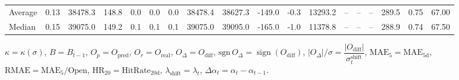 \begin{threeparttable}
{\begin{tabular}{lrrrrrrrrrrrrrrrrr}
Average &     0.13 & 38478.3 &             148.8 &               0.0 &                0.0 &                0.0 & 38478.4 & 38627.3 &     -149.0 &                     -0.3 &             13293.2 &         -- &        -- &             -- &            289.5 &            0.75 &                  67.00 \\
 Median &     0.15 & 39075.0 &             149.2 &               0.1 &                0.1 &                0.1 & 39075.0 & 39095.0 &     -165.0 &                     -1.0 &             11378.8 &         -- &        -- &             -- &            288.9 &            0.74 &                  67.50 \\
\bottomrule
\end{tabular}
}
\begin{tablenotes}\footnotesize
\item $\kappa=\kappa(\sigma)$, $B=B_{t-1}$, $O_p=O_{\text{pred}}$, $O_r=O_{\text{real}}$, $O_\Delta=O_{\text{diff}}$, $\mathrm{sgn}\,O_\Delta=\operatorname{sign}(O_{\text{diff}})$, $|O_\Delta|/\sigma=\dfrac{|O_{\text{diff}}|}{\sigma_t^{\text{shift}}}$, $\mathrm{MAE}_5=\mathrm{MAE}_{5\text{d}}$, $\mathrm{RMAE}= \mathrm{MAE}_5 / \text{Open}$, $\mathrm{HR}_{20}=\mathrm{HitRate}_{20\text{d}}$, 
$\lambda_{\text{shift}}=\lambda_t$, 
$\Delta\alpha_t=\alpha_t-\alpha_{t-1}$.
\end{tablenotes}
\end{threeparttable}
\endgroup

